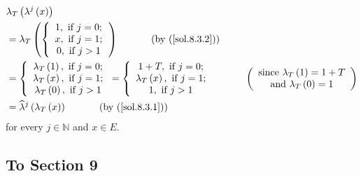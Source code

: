 \documentclass[numbers=enddot,12pt,final,onecolumn,notitlepage]{scrartcl}%
\begin{document}
\begin{align*}
&  \lambda_{T}\left(  \lambda^{j}\left(  x\right)  \right) \\
&  =\lambda_{T}\left(  \left\{
\begin{array}
[c]{c}%
1,\text{ if }j=0;\\
x,\text{ if }j=1;\\
0,\text{ if }j>1
\end{array}
\right.  \right)  \ \ \ \ \ \ \ \ \ \ \left(  \text{by (\ref{sol.8.3.2}%
)}\right) \\
&  =\left\{
\begin{array}
[c]{c}%
\lambda_{T}\left(  1\right)  ,\text{ if }j=0;\\
\lambda_{T}\left(  x\right)  ,\text{ if }j=1;\\
\lambda_{T}\left(  0\right)  ,\text{ if }j>1
\end{array}
\right.  =\left\{
\begin{array}
[c]{c}%
1+T,\text{ if }j=0;\\
\lambda_{T}\left(  x\right)  ,\text{ if }j=1;\\
1,\text{ if }j>1
\end{array}
\right.  \ \ \ \ \ \ \ \ \ \ \left(
\begin{array}
[c]{c}%
\text{since }\lambda_{T}\left(  1\right)  =1+T\\
\text{and }\lambda_{T}\left(  0\right)  =1
\end{array}
\right) \\
&  =\widehat{\lambda}^{j}\left(  \lambda_{T}\left(  x\right)  \right)
\ \ \ \ \ \ \ \ \ \ \left(  \text{by (\ref{sol.8.3.1})}\right)
\end{align*}
for every $j\in\mathbb{N}$ and $x\in E$.

\subsection{To Section 9}
\end{document}
